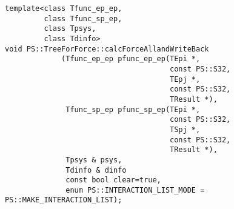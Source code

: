 \begin{screen}
\begin{verbatim}
template<class Tfunc_ep_ep,
         class Tfunc_sp_ep,
         class Tpsys,
         class Tdinfo>
void PS::TreeForForce::calcForceAllandWriteBack
             (Tfunc_ep_ep pfunc_ep_ep(TEpi *,
                                      const PS::S32,
                                      TEpj *,
                                      const PS::S32,
                                      TResult *),
              Tfunc_sp_ep pfunc_sp_ep(TEpi *,
                                      const PS::S32,
                                      TSpj *,
                                      const PS::S32,
                                      TResult *),
              Tpsys & psys,
              Tdinfo & dinfo
              const bool clear=true,
              enum PS::INTERACTION_LIST_MODE = PS::MAKE_INTERACTION_LIST);
\end{verbatim}
\end{screen}

